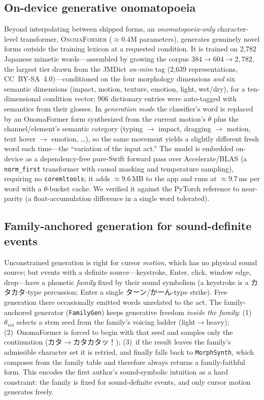 \documentclass[sigconf,nonacm]{acmart}
\newcommand{\jp}[1]{#1}
\begin{document}
\subsection{On-device generative onomatopoeia}
\label{sec:onomaformer}
Beyond interpolating between shipped forms, an \emph{onomatopoeia-only} character-level transformer, \textsc{OnomaFormer} (${\approx}0.4$M parameters), generates genuinely novel forms outside the training lexicon at a requested condition. It is trained on 2{,}782 Japanese mimetic words---assembled by growing the corpus $384\rightarrow604\rightarrow2{,}782$, the largest tier drawn from the JMDict \emph{on-mim} tag (2{,}639 representations, CC~BY-SA~4.0)---conditioned on the four morphology dimensions \emph{and} six semantic dimensions (impact, motion, texture, emotion, light, wet/dry), for a ten-dimensional condition vector; 906 dictionary entries were auto-tagged with semantics from their glosses. In \emph{generation mode} the classifier's word is replaced by an OnomaFormer form synthesized from the current motion's $\theta$ plus the channel/element's semantic category (typing $\to$ impact, dragging $\to$ motion, text hover $\to$ emotion, \ldots), so the same movement yields a slightly different fresh word each time---the ``variation of the input act.'' The model is embedded on-device as a dependency-free pure-Swift forward pass over Accelerate/BLAS (a \texttt{norm\_first} transformer with causal masking and temperature sampling), requiring no \texttt{coremltools}; it adds ${\approx}9.6$\,MB to the app and runs at ${\approx}9.7$\,ms per word with a $\theta$-bucket cache. We verified it against the PyTorch reference to near-parity (a float-accumulation difference in a single word tolerated).

\subsection{Family-anchored generation for sound-definite events}
\label{sec:family}
Unconstrained generation is right for cursor \emph{motion}, which has no physical sound source; but events with a definite source---keystroke, Enter, click, window edge, drop---have a phonetic \emph{family} fixed by their sound symbolism (a keystroke is a \jp{カタカタ}-type percussion; Enter a single \jp{ターン}/\jp{かーん}-type strike). Free generation there occasionally emitted words unrelated to the act. The family-anchored generator (\texttt{FamilyGen}) keeps generative freedom \emph{inside the family}: (1)~$\theta_{\mathrm{voi}}$ selects a stem seed from the family's voicing ladder (light$\to$heavy); (2)~OnomaFormer is forced to begin with that seed and samples only the continuation (\jp{カタ}$\rightarrow$\jp{カタカタッ！}); (3)~if the result leaves the family's admissible character set it is retried, and finally falls back to \texttt{MorphSynth}, which composes from the family table and therefore always returns a family-faithful form. This encodes the first author's sound-symbolic intuition as a hard constraint: the family is fixed for sound-definite events, and only cursor motion generates freely.
\end{document}
